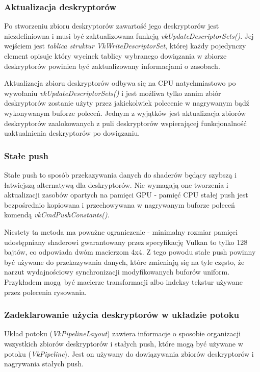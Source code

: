 \subsubsection{Aktualizacja deskryptorów}

Po stworzeniu zbioru deskryptorów zawartość jego deskryptorów jest niezdefiniowna i musi być zaktualizowana funkcją
\textit{vkUpdateDescriptorSets()}. Jej wejściem jest \textit{tablica struktur VkWriteDescriptorSet}, której każdy pojedynczy element opisuje
który wycinek tablicy wybranego dowiązania w zbiorze deskryptorów powinien być zaktualizowany informacjami o zasobach.

Aktualizacja zbioru deskryptorów odbywa się na CPU natychmiastowo po wywołaniu \textit{vkUpdateDescriptorSets()} i jest możliwa
tylko zanim zbiór deskryptorów zostanie użyty przez jakiekolwiek polecenie w nagrywanym bądź wykonywanym buforze poleceń.
Jednym z wyjątków jest aktualizacja zbiorów deskryptorów zaalokowanych z puli deskryptorów wspierającej funkcjonalność uaktualnienia deskryptorów po dowiązaniu.

\subsubsection{Stałe push}

Stałe push to sposób przekazywania danych do shaderów będący szybszą i łatwiejszą 
alternatywą dla deskryptorów. Nie wymagają one tworzenia i aktualizacji zasobów opartych na pamięci GPU - pamięć CPU stałej push jest bezpośrednio kopiowana i przechowywana w nagrywanym buforze poleceń komendą \textit{vkCmdPushConstants()}.

Niestety ta metoda ma poważne ograniczenie - minimalny rozmiar pamięci udostępniany shaderowi gwarantowany przez specyfikację Vulkan to tylko 128 bajtów, co odpowiada dwóm macierzom 4x4. Z tego powodu stałe push powinny być używane do przekazywania danych, które zmieniają się na tyle często, że narzut wydajnościowy synchronizacji modyfikowanych buforów uniform. Przykładem mogą być macierze transformacji albo indeksy tekstur używane przez polecenia rysowania.


\subsubsection{Zadeklarowanie użycia deskryptorów w układzie potoku}

Układ potoku (\textit{VkPipelineLayout}) zawiera informacje o sposobie organizacji wszystkich zbiorów deskryptorów i stałych push, które mogą być używane w potoku (\textit{VkPipeline}). Jest on używany do dowiązywania zbiorów deskryptorów i nagrywania stałych push.

